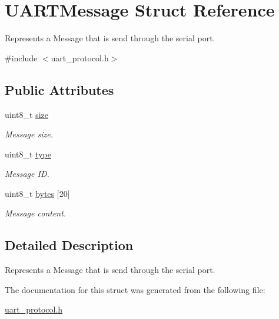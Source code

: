 \hypertarget{struct_u_a_r_t_message}{}\section{U\+A\+R\+T\+Message Struct Reference}
\label{struct_u_a_r_t_message}


Represents a Message that is send through the serial port.  




{\ttfamily \#include $<$uart\+\_\+protocol.\+h$>$}

\subsection*{Public Attributes}
\begin{DoxyCompactItemize}
\item 
uint8\+\_\+t \mbox{\hyperlink{group__uart__protocol_ga6394755586b0b959fe069b16b85c749b}{size}}
\begin{DoxyCompactList}\small\item\em Message size. \end{DoxyCompactList}\item 
uint8\+\_\+t \mbox{\hyperlink{group__uart__protocol_ga5249b6396f5721526146e662d7afefe4}{type}}
\begin{DoxyCompactList}\small\item\em Message ID. \end{DoxyCompactList}\item 
uint8\+\_\+t \mbox{\hyperlink{group__uart__protocol_gafd3143672ede91e5dc2ec4d1b95f191b}{bytes}} \mbox{[}20\mbox{]}
\begin{DoxyCompactList}\small\item\em Message content. \end{DoxyCompactList}\end{DoxyCompactItemize}


\subsection{Detailed Description}
Represents a Message that is send through the serial port. 

The documentation for this struct was generated from the following file\+:\begin{DoxyCompactItemize}
\item 
\mbox{\hyperlink{uart__protocol_8h}{uart\+\_\+protocol.\+h}}\end{DoxyCompactItemize}
